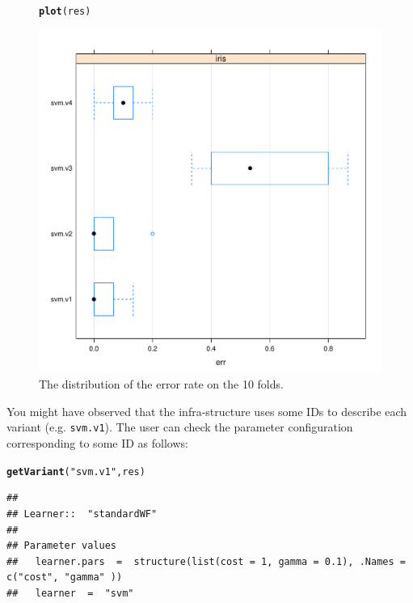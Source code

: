 \documentclass[10pt,a4paper]{article}\usepackage[]{graphicx}\usepackage[]{color}
\makeatletter
\def\maxwidth{ %
  \ifdim\Gin@nat@width>\linewidth
    \linewidth
  \else
    \Gin@nat@width
  \fi
}
\newcommand{\hlstr}[1]{\textcolor[rgb]{0.192,0.494,0.8}{#1}}%
\newcommand{\hlstd}[1]{\textcolor[rgb]{0.345,0.345,0.345}{#1}}%
\newcommand{\hlkwd}[1]{\textcolor[rgb]{0.737,0.353,0.396}{\textbf{#1}}}%
\newenvironment{kframe}{%
 \def\at@end@of@kframe{}%
 \ifinner\ifhmode%
  \def\at@end@of@kframe{\end{minipage}}%
  \begin{minipage}{\columnwidth}%
 \fi\fi%
 \def\FrameCommand##1{\hskip\@totalleftmargin \hskip-\fboxsep
 \colorbox{shadecolor}{##1}\hskip-\fboxsep
     \hskip-\linewidth \hskip-\@totalleftmargin \hskip\columnwidth}%
 \MakeFramed {\advance\hsize-\width
   \@totalleftmargin\z@ \linewidth\hsize
   \@setminipage}}%
 {\par\unskip\endMakeFramed%
 \at@end@of@kframe}
\newenvironment{knitrout}{}{} %
\makeatother
\begin{document}
\begin{figure}[ht]
  \centering
\begin{knitrout}
\color{fgcolor}\begin{kframe}
\begin{alltt}
\hlkwd{plot}\hlstd{(res)}
\end{alltt}
\end{kframe}

{\centering \includegraphics[width=\maxwidth]{figure/minimal-unnamed-chunk-5} 

}



\end{knitrout}

  \caption{The distribution of the error rate on the 10 folds.}
  \label{fig:ex1Iris}
\end{figure}

You might have observed that the infra-structure uses some IDs to
describe each variant (e.g. \texttt{svm.v1}). The user can check
the parameter configuration corresponding to some ID as follows:

\begin{knitrout}
\color{fgcolor}\begin{kframe}
\begin{alltt}
\hlkwd{getVariant}\hlstd{(}\hlstr{"svm.v1"}\hlstd{, res)}
\end{alltt}
\begin{verbatim}
## 
## Learner::  "standardWF" 
## 
## Parameter values
## 	 learner.pars  =  structure(list(cost = 1, gamma = 0.1), .Names = c("cost", "gamma" )) 
## 	 learner  =  "svm"
\end{verbatim}
\end{kframe}
\end{knitrout}
\end{document}
